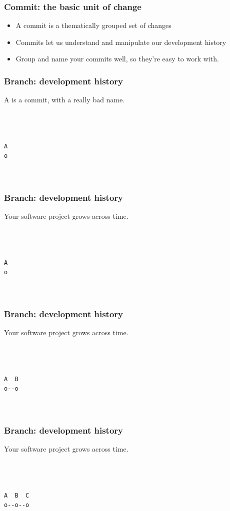 \documentclass[unknownkeysallowed]{beamer}
\begin{document}
\begin{frame}
	\frametitle{Commit: the basic unit of change}
	\begin{itemize}
	    \item{A commit is a thematically grouped set of changes}
        \vspace{0.5cm}
	    \item{Commits let us understand and manipulate our development history}
        \vspace{0.5cm}
	    \item{Group and name your commits well, so they're easy to work with.}
	\end{itemize}
\end{frame}

\begin{frame}[fragile]
	\frametitle{Branch: development history}
	A is a commit, with a really bad name.

\begin{verbatim}



A  
o



\end{verbatim}
\end{frame}

\begin{frame}[fragile]
	\frametitle{Branch: development history}
	Your software project grows across time.
\begin{verbatim}



A  
o



\end{verbatim}
\end{frame}

\begin{frame}[fragile]
	\frametitle{Branch: development history}
	    Your software project grows across time.
\begin{verbatim}



A  B
o--o
   


\end{verbatim}
\end{frame}

\begin{frame}[fragile]
	\frametitle{Branch: development history}
	    Your software project grows across time.
\begin{verbatim}



A  B  C
o--o--o
      
     
    
\end{verbatim}
\end{frame}
\end{document}
